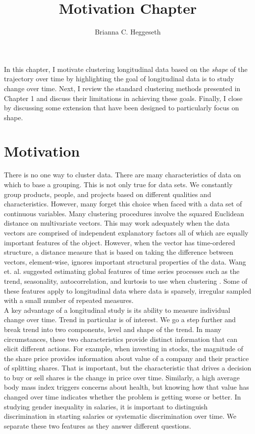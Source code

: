 \documentclass[12pt]{article}
\title{Motivation Chapter}
\author{Brianna C. Heggeseth}
\begin{document}
\doublespace
\maketitle
 In this chapter, I motivate clustering longitudinal data based on the {\em shape} of the trajectory over time by highlighting the goal of longitudinal data is to study change over time. Next, I review the standard clustering methods presented in Chapter 1 and discuss their limitations in achieving these goals. Finally, I close by discussing some extension that have been designed to particularly focus on shape.

\section{Motivation}
There is no one way to cluster data. There are many characteristics of data on which to base a grouping. This is not only true for data sets. We constantly group products, people, and projects based on different qualities and characteristics. However, many forget this choice when faced with a data set of continuous variables. Many clustering procedures involve the squared Euclidean distance on multivariate vectors. This may work adequately when the data vectors are comprised of independent explanatory factors all of which are equally important features of the object. However, when the vector has time-ordered structure, a distance measure that is based on taking the difference between vectors, element-wise, ignores important structural properties of the data. Wang et. al. suggested estimating global features of time series processes such as the trend, seasonality, autocorrelation, and kurtosis to use when clustering \cite{wang2006}. Some of these features apply to longitudinal data where data is sparsely, irregular sampled with a small number of repeated measures. \\

A key advantage of a longitudinal study is its ability to measure individual change over time. Trend in particular is of interest. We go a step further and break trend into two components, level and shape of the trend. In many circumstances, these two characteristics provide distinct information that can elicit different actions. For example, when investing in stocks, the magnitude of the share price provides information about value of a company and their practice of splitting shares. That is important, but the characteristic that drives a decision to buy or sell shares is the change in price over time. Similarly, a high average body mass index triggers concerns about health, but knowing how that value has changed over time indicates whether the problem is getting worse or better. In studying gender inequality in salaries, it is important to distinguish discrimination in starting salaries or systematic discrimination over time. We separate these two features as they answer different questions. \\
\end{document}
